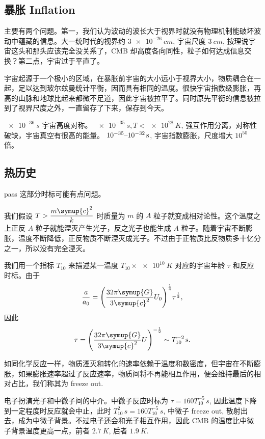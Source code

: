 \documentclass[../天体物理基础.tex]{subfiles}
\begin{document}
\subsection{暴胀 Inflation}
主要有两个问题。第一，我们认为波动的波长大于视界时就没有物理机制能破坏波动中蕴藏的信息。大一统时代的视界约 $\qty{3e-26}{cm}$, 宇宙尺度 $\qty{3}{cm}$, 按理说宇宙这头和那头应该完全没关系了，CMB 却高度各向同性，粒子如何达成信息交换？第二点，宇宙过于平直了。

宇宙起源于一个极小的区域，在暴胀前宇宙的大小远小于视界大小，物质耦合在一起，足以达到玻尔兹曼统计平衡，因而具有相同的温度。很快宇宙指数级膨胀，再高的山脉和地球比起来都微不足道，因此宇宙被拉平了。同时原先平衡的信息被拉到了视界尺度之外，一直留存了下来，保存到今天。

$\qty{e-36}{s}$ 宇宙高度对称。
$\qty{e-35}{s}, T<\qty{e28}{K}$, 强互作用分离，对称性破缺，宇宙真空有很高的能量。
$10^{-35}\text{\textendash}\qty{e-32}{s}$, 宇宙指数膨胀，尺度增大 $10^{50}$ 倍。

\subsection{热历史}
pass 这部分时标可能有点问题。

我们假设 $T>\dfrac{m\symup{c}^{2}}{k}$ 时质量为 $m$ 的 $A$ 粒子就变成相对论性。这个温度之上正反 $A$ 粒子就能湮灭产生光子，反之光子也能生成 $A$ 粒子。随着宇宙不断膨胀，温度不断降低，正反物质不断湮灭成光子。不过由于正物质比反物质多十亿分之一，所以没有完全湮灭。

我们用一个指标 $T_{10}$ 来描述某一温度 $T_{10}\times\qty{e10}{K}$ 对应的宇宙年龄 $\tau$ 和反应时标。由于
\begin{equation}
\frac{a}{a_{0}}=\mleft(\frac{32\pi\symup{G}}{3\symup{c}^{2}}U_{0}\mright)^{\frac{1}{4}}\tau^{\frac{1}{2}},
\end{equation}
因此
\begin{equation}
\tau=\mleft(\frac{32\pi\symup{G}}{3\symup{c}^{2}}U\mright)^{-\frac{1}{2}}\sim T_{10}^{-2}\,\unit{s}.
\end{equation}

如同化学反应一样，物质湮灭和转化的速率依赖于温度和数密度，但宇宙在不断膨胀，如果膨胀速率超过了反应速率，物质间将不再能相互作用，便会维持最后的相对占比，我们称其为 freeze out.

电子扮演光子和中微子间的中介。中微子反应时标为 $\tau=160T_{10}^{-5}\,\unit{s}$, 因此温度下降到一定程度时反应就会中止，此时 $T_{10}^{2}\,\unit{s}=160T_{10}^{-5}\,\unit{s}$, 中微子 freeze out, 散射出去，成为中微子背景。不过电子还会和光子相互作用，因此 CMB 的温度比中微子背景温度更高一点，前者 $\qty{2.7}{K}$, 后者 $\qty{1.9}{K}$.
\end{document}

